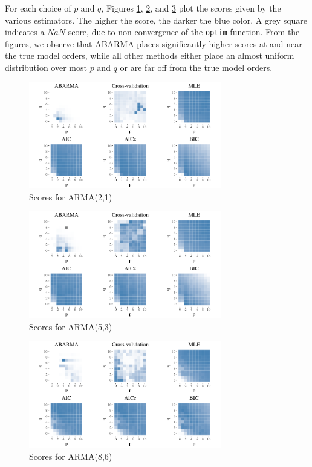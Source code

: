 For each choice of $p$ and $q$, Figures \ref{heatmap21_v2}, \ref{heatmap53_v2}, and \ref{heatmap86_v2} plot the scores given by the various estimators. The higher the score, the darker the blue color. A grey square indicates a $NaN$ score, due to non-convergence of the {\tt optim} function. From the figures, we observe that ABARMA places significantly higher scores at and near the true model orders, while all other methods either place an almost uniform distribution over most $p$ and $q$ or are far off from the true model orders.

\begin{figure}
    \centering
    \includegraphics[width=3.3in]{heatmap21_v2.png}
    \caption{Scores for ARMA(2,1)}
    \label{heatmap21_v2}
\end{figure}

\begin{figure}
    \centering
    \includegraphics[width=3.3in]{heatmap53_v2.png}
    \caption{Scores for ARMA(5,3)}
    \label{heatmap53_v2}
\end{figure}

\begin{figure}
    \centering
    \includegraphics[width=3.3in]{heatmap86_v3.png}
    \caption{Scores for ARMA(8,6)}
    \label{heatmap86_v2}
\end{figure}

